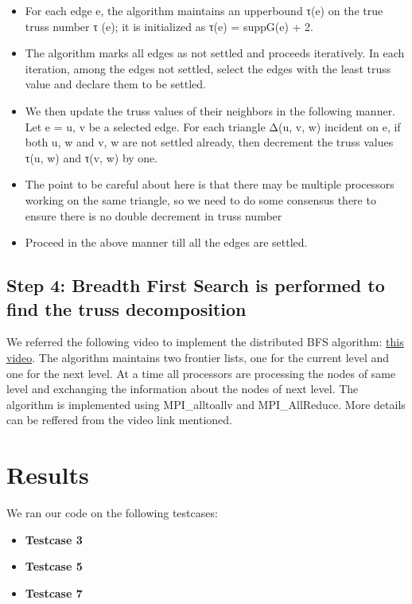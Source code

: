\documentclass{article}
\begin{document}
\begin{itemize}
    \item For each edge e, the algorithm maintains an upperbound τ(e) on the true truss number τ (e); it is initialized as τ(e) = suppG(e) + 2.
    \item The algorithm marks all edges as not settled and proceeds iteratively. In each iteration, among the edges not settled, select the edges with the least truss value and declare them to be settled.
    \item We then update the truss values of their neighbors in the following manner. Let e = u, v be a selected edge. For each triangle Δ(u, v, w) incident on e, if both u, w and v, w are not settled already, then decrement the truss values τ(u, w) and τ(v, w) by one.
    \item The point to be careful about here is that there may be multiple processors working on the same triangle, so we need to do some consensus there to ensure there is no double decrement in truss number
    \item Proceed in the above manner till all the edges are settled.

\end{itemize}


\subsection{Step 4: Breadth First Search is performed to find the truss decomposition}
We referred the following video to implement the distributed BFS algorithm: \href{https://www.youtube.com/watch?v=wpWvCabHqQU}{this video}. The algorithm maintains two frontier lists, one for the current level and one for the next level. At a time all processors are processing the nodes of same level and exchanging the information about the nodes of next level. The algorithm is implemented using MPI\_alltoallv and MPI\_AllReduce. More details can be reffered from the video link mentioned.


\section{Results}
We ran our code on the following testcases:
\begin{itemize}
    \item \textbf{Testcase 3}
    \item \textbf{Testcase 5} 
    \item \textbf{Testcase 7}
\end{itemize}
\end{document}
